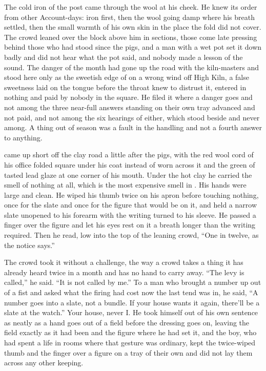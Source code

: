 The cold iron of the post came through the wool at his cheek. He knew its order from other Account-days: iron first, then the wool going damp where his breath settled, then the small warmth of his own skin in the place the fold did not cover. The crowd leaned over the block above him in sections, those come late pressing behind those who had stood since the pigs, and a man with a wet pot set it down badly and did not hear what the pot said, and nobody made a lesson of the sound. The danger of the month had gone up the road with the kiln-masters and stood here only as the sweetish edge of  on a wrong wind off High Kiln, a false sweetness laid on the tongue before the throat knew to distrust it, entered in nothing and paid by nobody in the square. He filed it where a danger goes and not among the three near-full answers standing on their own tray advanced and not paid, and not among the six hearings of  either, which stood beside and never among. A thing out of season was a fault in the handling and not a fourth answer to anything.

\scenebreak

 came up short off the clay road a little after the pigs, with the red wool cord of his office folded square under his coat instead of worn across it and the green of tasted lead glaze at one corner of his mouth. Under the hot clay he carried the smell of nothing at all, which is the most expensive smell in . His hands were large and clean. He wiped his thumb twice on his apron before touching nothing, once for the slate and once for the figure that would be on it, and held a narrow slate unopened to his forearm with the writing turned to his sleeve. He passed a finger over the figure and let his eyes rest on it a breath longer than the writing required. Then he read, low into the top of the leaning crowd, “One in twelve, as the notice says.”

The crowd took it without a challenge, the way a crowd takes a thing it has already heard twice in a month and has no hand to carry away. “The levy is called,” he said. “It is not called by me.” To a man who brought a number up out of a fist and asked what the firing had cost now the last tend was in, he said, “A number goes into a slate, not a bundle. If your house wants it again, there'll be a slate at the watch.” Your house, never I. He took himself out of his own sentence as neatly as a hand goes out of a field before the dressing goes on, leaving the field exactly as it had been and the figure where he had set it, and the boy, who had spent a life in rooms where that gesture was ordinary, kept the twice-wiped thumb and the finger over a figure on a tray of their own and did not lay them across any other keeping.

